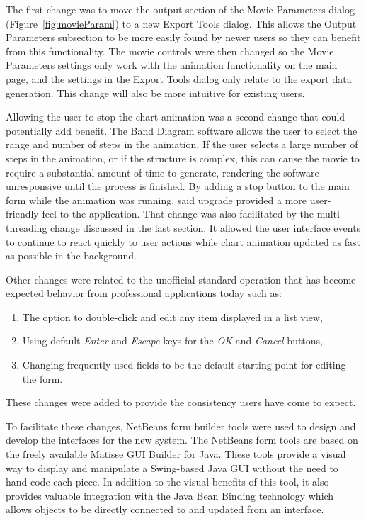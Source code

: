 \documentclass[project]{bsu-ms}
\begin{document}
The first change was to move the output section of the Movie Parameters dialog (Figure~\ref{fig:movieParam}) to a new Export Tools dialog. This allows the Output Parameters subsection to be more easily found by newer users so they can benefit from this functionality. The movie controls were then changed so the Movie Parameters settings only work with the animation functionality on the main page, and the settings in the Export Tools dialog only relate to the export data generation. This change will also be more intuitive for existing users.

Allowing the user to stop the chart animation was a second change that could potentially add benefit. The Band Diagram software allows the user to select the range and number of steps in the animation. If the user selects a large number of steps in the animation, or if the structure is complex, this can cause the movie to require a substantial amount of time to generate, rendering the software unresponsive until the process is finished. By adding a stop button to the main form while the animation was running, said upgrade provided a more user-friendly feel to the application. That change was also facilitated by the multi-threading change discussed in the last section. It allowed the user interface events to continue to react quickly to user actions while chart animation updated as fast as possible in the background. 

Other changes were related to the unofficial standard operation that has become expected behavior from professional applications today such as:
\begin{enumerate}
\item The option to double-click and edit any item displayed in a list view,
\item Using default \emph{Enter} and \emph{Escape} keys for the \emph{OK} and \emph{Cancel} buttons,
\item Changing frequently used fields to be the default starting point for editing the form.
\end{enumerate}

These changes were added to provide the consistency users have come to expect.

To facilitate these changes, NetBeans form builder tools were used to design and develop the interfaces for the new system. The NetBeans form tools are based on the freely available Matisse GUI Builder for Java. These tools provide a visual way to display and manipulate a Swing-based Java GUI without the need to hand-code each piece. In addition to the visual benefits of this tool, it also provides valuable integration with the Java Bean Binding technology which allows objects to be directly connected to and updated from an interface. 
\end{document}

